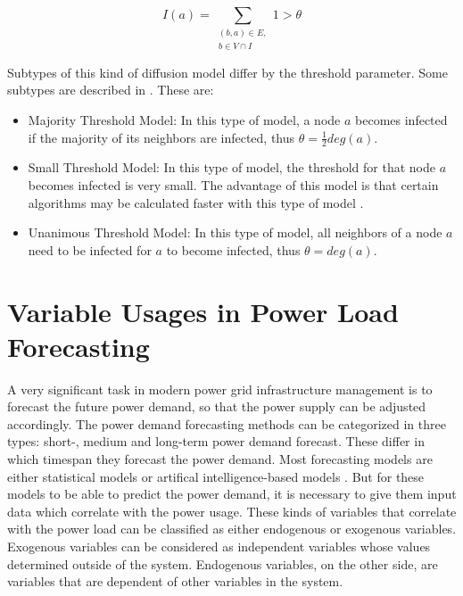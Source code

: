 \begin{equation}
    I(a) = \sum\limits_{\substack{(b,a)\in E, \\ b \in V \cap I}}
    1 > \theta    
    \label{eq:threshold}
\end{equation}

Subtypes of this kind of diffusion model differ by the threshold parameter.
Some subtypes are described in \cite{diffusionbasics}. These are:

\begin{itemize}
    \item Majority Threshold Model: In this type of model, a node $a$ becomes
    infected if the majority of its neighbors are infected, thus 
    $\theta = \frac{1}{2}deg(a)$.
    \item Small Threshold Model: In this type of model, the threshold for that
    node $a$ becomes infected is very small. The advantage of this model is that 
    certain algorithms may be calculated faster with this type of model 
    \cite{diffusionbasics}.
    \item Unanimous Threshold Model: In this type of model, all neighbors 
    of a node $a$ need to be infected for $a$ to become infected, thus
    $\theta = deg(a)$.
\end{itemize}


\section{Variable Usages in Power Load Forecasting}
\label{powerloadsection}
A very significant task in modern power grid infrastructure management 
is to forecast
the future power demand, so that the power supply can be adjusted accordingly.
The power demand forecasting methods can be categorized in three types:
short-, medium and long-term power demand forecast. These differ in which
timespan they forecast the power demand. Most forecasting models are 
either statistical models or artifical intelligence-based models 
\cite{raza2015review}. But for these models to be able to predict the power 
demand, it is necessary to give them input data which correlate with the power 
usage. These kinds of variables that correlate with the power load 
can be classified as either endogenous or exogenous variables.
Exogenous variables can be considered as independent variables 
whose values determined outside of the system. 
Endogenous variables, on the other side, 
are variables that are dependent of other variables in the 
system.


